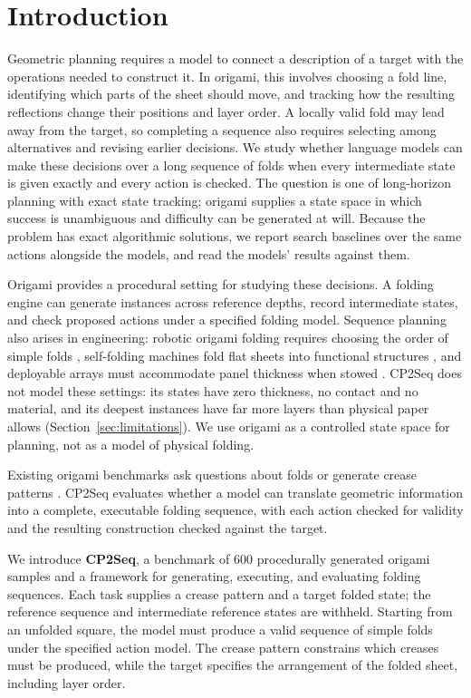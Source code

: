 \section{Introduction}
\label{sec:intro}

Geometric planning requires a model to connect a description of a target with the operations
needed to construct it. In origami, this involves choosing a fold line, identifying which parts of
the sheet should move, and tracking how the resulting reflections change their positions and layer
order. A locally valid fold may lead away from the target, so completing a sequence also requires
selecting among alternatives and revising earlier decisions. We study whether language models can
make these decisions over a long sequence of folds when every intermediate state is given exactly
and every action is checked. The question is one of long-horizon planning with exact state
tracking; origami supplies a state space in which success is unambiguous and difficulty can be
generated at will. Because the problem has exact algorithmic solutions, we report search baselines
over the same actions alongside the models, and read the models' results against them.

Origami provides a procedural setting for studying these decisions. A folding engine can
generate instances across reference depths, record intermediate states, and check proposed
actions under a specified folding model.
Sequence planning also arises in engineering: robotic origami folding requires choosing the order
of simple folds \citep{balkcom-robotic-origami}, self-folding machines fold flat sheets into
functional structures \citep{felton-self-folding}, and deployable arrays must accommodate panel
thickness when stowed \citep{zirbel-thickness}. CP2Seq does not model these settings: its states
have zero thickness, no contact and no material, and its deepest instances have far more layers
than physical paper allows (Section~\ref{sec:limitations}). We use origami as a controlled state
space for planning, not as a model of physical folding.

Existing origami benchmarks ask questions about folds or generate crease patterns
\citep{gamibench,origamispace}.
CP2Seq evaluates whether a model can translate geometric information into a complete, executable
folding sequence, with each action checked for validity and the resulting construction checked
against the target.

We introduce \textbf{CP2Seq}, a benchmark of 600 procedurally generated origami samples and a
framework for generating, executing, and evaluating folding sequences. Each task supplies a crease
pattern and a target folded state; the reference sequence and intermediate reference states are
withheld. Starting from an unfolded square, the model must produce a valid sequence of simple
folds under the specified action model. The crease pattern constrains which creases must be
produced, while the target specifies the arrangement of the folded sheet, including layer order.

